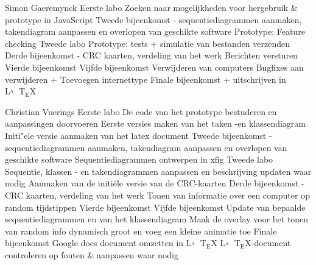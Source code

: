 \documentclass[a4paper,oneside]{report}
\def\latex{$\mathrm{L\!\!^{{}_{\scriptstyle A}} \!\!\!\!\!\;\; T\!_{\displaystyle E} \!
X}$}
\begin{document}
\begin{studentlog}{Simon Gaeremynck}
{Eerste labo}
{Zoeken naar mogelijkheden voor hergebruik \& prototype in JavaScript}
{Tweede bijeenkomst - sequentiediagrammen aanmaken, takendiagram aanpassen en overlopen van geschikte software}
{Prototype: Feature checking}
{Tweede labo}
{Prototype: tests + simulatie van bestanden verzenden}
{Derde bijeenkomst - CRC kaarten, verdeling van het werk}
{Berichten versturen}
{Vierde bijeenkomst}
{Vijfde bijeenkomst}
{Verwijderen van computers}
{Bugfixes aan verwijderen + Toevoegen internettype}
{Finale bijeenkomst + uitschrijven in \latex}
\end{studentlog}

\begin{studentlog}{Christian Vuerings}
{Eerste labo}
{De code van het prototype bestuderen en aanpassingen doorvoeren}
{Eerste versies maken van het taken -en klassendiagram}
{Initi"ele versie aanmaken van het latex document}
{Tweede bijeenkomst - sequentiediagrammen aanmaken, takendiagram aanpassen en overlopen van geschikte software}
{Sequentiediagrammen ontwerpen in xfig}
{Tweede labo}
{Sequentie, klassen - en takendiagrammen aanpassen en beschrijving updaten waar nodig}
{Aanmaken van de initiële versie van de CRC-kaarten}
{Derde bijeenkomst - CRC kaarten, verdeling van het werk}
{Tonen van informatie over een computer op random tijdstippen}   
{Vierde bijeenkomst}
{Vijfde bijeenkomst}
{Update van bepaalde sequentiediagrammen en van het klassendiagram}
{Maak de overlay voor het tonen van random info dynamisch groot en voeg een kleine animatie toe}
{Finale bijeenkomst}
{Google docs document omzetten in \latex}
{\latex -document controleren op fouten \& aanpassen waar nodig}
\end{studentlog}
\end{document}
